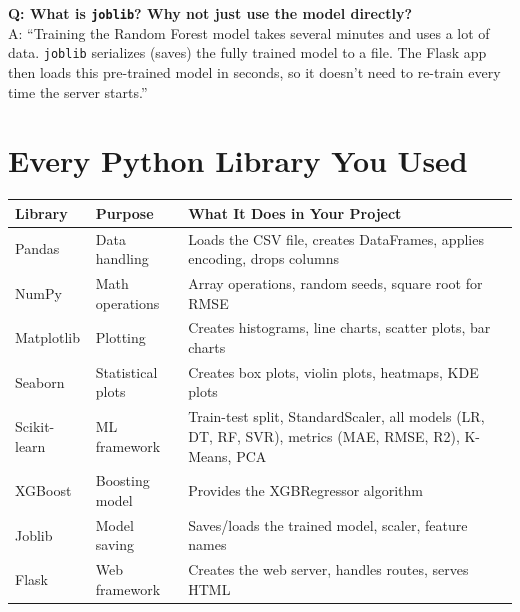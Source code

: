 \documentclass[12pt, a4paper]{article}
\begin{document}
\begin{warnbox}
    \textbf{Q: What is \texttt{joblib}? Why not just use the model directly?} \\
    A: ``Training the Random Forest model takes several minutes and uses a lot of data. \texttt{joblib} serializes (saves) the fully trained model to a file. The Flask app then loads this pre-trained model in seconds, so it doesn't need to re-train every time the server starts.''
\end{warnbox}



\part{Every Python Library You Used}

\begin{center}
\begin{tabular}{|l|l|p{7cm}|}
    \hline
    \textbf{Library} & \textbf{Purpose} & \textbf{What It Does in Your Project} \\
    \hline
    Pandas & Data handling & Loads the CSV file, creates DataFrames, applies encoding, drops columns \\
    \hline
    NumPy & Math operations & Array operations, random seeds, square root for RMSE \\
    \hline
    Matplotlib & Plotting & Creates histograms, line charts, scatter plots, bar charts \\
    \hline
    Seaborn & Statistical plots & Creates box plots, violin plots, heatmaps, KDE plots \\
    \hline
    Scikit-learn & ML framework & Train-test split, StandardScaler, all models (LR, DT, RF, SVR), metrics (MAE, RMSE, R2), K-Means, PCA \\
    \hline
    XGBoost & Boosting model & Provides the XGBRegressor algorithm \\
    \hline
    Joblib & Model saving & Saves/loads the trained model, scaler, feature names \\
    \hline
    Flask & Web framework & Creates the web server, handles routes, serves HTML \\
    \hline
\end{tabular}
\end{center}
\end{document}
